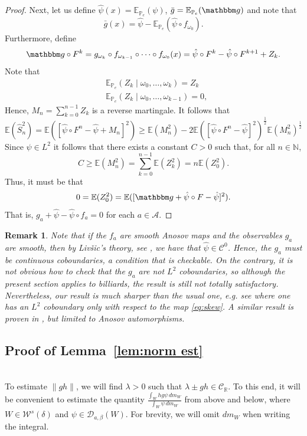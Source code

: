 \documentclass{amsart}
\numberwithin{equation}{section}
\newtheorem{rem}[thm]{Remark}
\newcommand\cA{{\mathcal A}}
\newcommand\cC{{\mathcal C}}
\newcommand\cD{{\mathcal D}}
\newcommand\cW{{\mathcal W}}
\newcommand\bE{{\mathbb E}}
\newcommand\bN{{\mathbb N}}
\newcommand\bP{{\mathbb P}}
\newcommand\bR{{\mathbb R}}
\newcommand{\bbg}{\mathbbm g}
\begin{document}
\begin{proof}
Next, let us define $\hat \psi(x)=\bE_{\bP_e}(\psi)$, $\bar g=\bE_{\bP_e}(\bbg)$ and note that
\[
\bar g(x)=\hat\psi-\bE_{\bP_e}(\hat\psi\circ f_{\omega_0}).
\]
Furthermore, define
\[
\bbg\circ F^k=g_{\omega_k}\circ f_{\omega_{k-1}}\circ \cdots\circ f_{\omega_0}(x)=\hat\psi\circ F^{k}-\hat\psi \circ F^{k+1}+Z_k.
\]
Note that
\[
\begin{split}
&\bE_{\bP_e}(Z_k\;|\;\omega_{0},\dots,\omega_{k})=Z_k\\
&\bE_{\bP_e}(Z_k\;|\;\omega_{0},\dots,\omega_{k-1})=0,
\end{split}
\]
Hence, $M_n=\sum_{k=0}^{n-1}Z_k$ is a reverse martingale. It follows that
\[
\bE(\hat S_n^2)=\bE\left([\hat\psi\circ F^n-\hat \psi+M_n]^2\right)\geq \bE(M_n^2)-2\bE([\hat\psi\circ F^n-\hat \psi]^2)^{\frac12}\bE(M_n^2)^{\frac 12}
\]
Since $\psi\in L^2$ it follows that there exists a constant $C>0$ such that, for all $n\in\bN$,
\[
C\geq \bE(M_n^2)=\sum_{k=0}^{n-1}\bE(Z_k^2)=n\bE(Z_0^2).
\] 
Thus, it must be that
\[
0=\bE(Z_0^2)=\bE([\bbg+\hat\psi\circ F-\hat \psi]^2).
\]
That is, $g_{a}+\hat\psi-\hat\psi\circ f_{a}=0$ for each $a\in \cA$. 
\end{proof}
\begin{rem}\label{rem:L2cob} Note that if the $f_a$ are smooth Anosov maps and the observables $g_a$ are smooth, then by Liv\v{s}ic's theory, see \cite{LMM89}, we have that $\hat \psi\in\cC^0$. Hence, the $g_a$ must be continuous coboundaries, a condition that is checkable. On the contrary, it is not obvious how to check that the $g_a$ are not $L^2$ coboundaries, so although the present section applies to billiards, the result is still not totally satisfactory. Nevertheless, our result is much sharper than the usual one, e.g. see \cite[Equation (2.10)]{Ki98 } where one has an $L^2$ coboundary only with respect to the map \eqref{eq:skew}. A similar result is proven in \cite{ALS09}, but limited to Anosov automorphisms.
\end{rem}


\subsection{Proof of Lemma~\ref{lem:norm est}}\label{sec:lemmaO1}\ \\
To estimate $\| gh \|$, we will find $\lambda > 0$ such that $\lambda \pm gh \in \cC_\bR$.  To this end, it will be convenient
to estimate the quantity $\frac{\int_W hg  \psi \, dm_W}{\int_W \psi \, dm_W}$ from above and below, where
$W \in \cW^s(\delta)$ and $\psi \in \cD_{a,\beta}(W)$.  For brevity, we will omit $dm_W$ when writing the integral.
\end{document}
